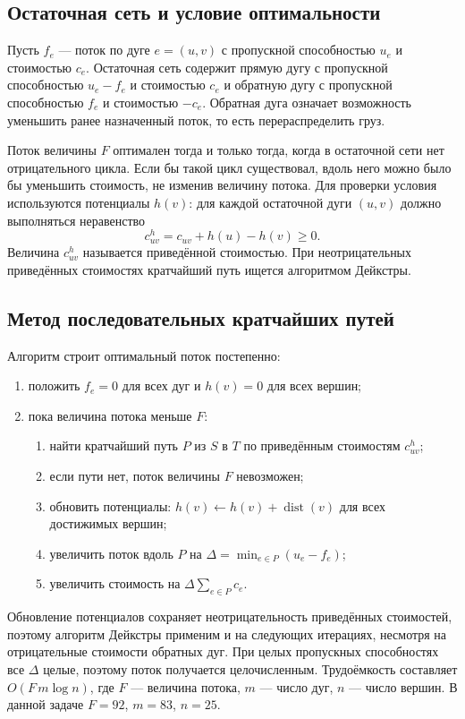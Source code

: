 \subsection*{Остаточная сеть и условие оптимальности}

Пусть $f_e$ --- поток по дуге $e=(u,v)$ с пропускной способностью $u_e$ и
стоимостью $c_e$. Остаточная сеть содержит прямую дугу с пропускной
способностью $u_e-f_e$ и стоимостью $c_e$ и обратную дугу с пропускной
способностью $f_e$ и стоимостью $-c_e$. Обратная дуга означает возможность
уменьшить ранее назначенный поток, то есть перераспределить груз.

Поток величины $F$ оптимален тогда и только тогда, когда в остаточной сети
нет отрицательного цикла. Если бы такой цикл существовал, вдоль него можно
было бы уменьшить стоимость, не изменив величину потока. Для проверки
условия используются потенциалы $h(v)$: для каждой остаточной дуги $(u,v)$
должно выполняться неравенство
\[
c^{h}_{uv}=c_{uv}+h(u)-h(v)\ge 0.
\]
Величина $c^{h}_{uv}$ называется приведённой стоимостью. При неотрицательных
приведённых стоимостях кратчайший путь ищется алгоритмом Дейкстры.

\subsection*{Метод последовательных кратчайших путей}

Алгоритм строит оптимальный поток постепенно:
\begin{enumerate}
    \item положить $f_e=0$ для всех дуг и $h(v)=0$ для всех вершин;
    \item пока величина потока меньше $F$:
    \begin{enumerate}
        \item найти кратчайший путь $P$ из $S$ в $T$ по приведённым
              стоимостям $c^{h}_{uv}$;
        \item если пути нет, поток величины $F$ невозможен;
        \item обновить потенциалы: $h(v)\leftarrow h(v)+\operatorname{dist}(v)$
              для всех достижимых вершин;
        \item увеличить поток вдоль $P$ на
              $\Delta=\min_{e\in P}(u_e-f_e)$;
        \item увеличить стоимость на $\Delta\sum_{e\in P}c_e$.
    \end{enumerate}
\end{enumerate}
Обновление потенциалов сохраняет неотрицательность приведённых стоимостей,
поэтому алгоритм Дейкстры применим и на следующих итерациях, несмотря на
отрицательные стоимости обратных дуг. При целых пропускных способностях
все $\Delta$ целые, поэтому поток получается целочисленным. Трудоёмкость
составляет $O(F\,m\log n)$, где $F$ --- величина потока, $m$ --- число дуг,
$n$ --- число вершин. В данной задаче $F=92$, $m=83$, $n=25$.

